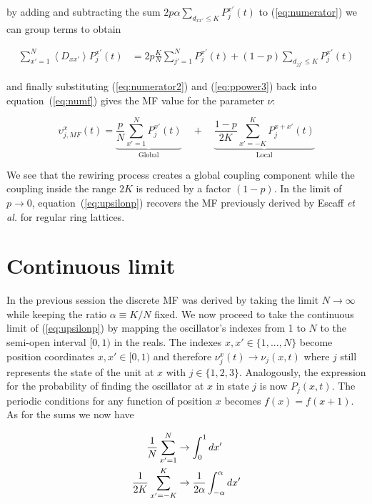 \noindent by adding and subtracting the sum $2p\alpha\sum_{d_{xx'} \leq K}P^{x'}_j(t)$ to (\ref{eq:numerator}) we can group terms to
obtain

\begin{align}
    \sum_{x'=1}^N \left< D_{xx'} \right> P_j^{x'}(t) &= 2p\frac{K}{N}\sum_{j'=1}^N P^{x'}_j(t) + (1-p)\sum_{d_{jj'} \leq K} P^{x'}_j(t)
    \label{eq:numerator2}
\end{align}

\noindent and finally substituting (\ref{eq:numerator2}) and (\ref{eq:ppower3}) back into equation~(\ref{eq:numf}) gives the MF value
for the parameter $\nu$:

\begin{equation}
    \upsilon_{j,MF}^x(t) = \underbrace{\frac{p}{N}\sum_{x'=1}^N P^{x'}_j(t)}_{\text{Global}}
\quad + \quad \underbrace{\frac{1-p}{2K}\sum_{x'=-K}^K P^{x+x'}_j(t)}_{\text{Local}}
    \label{eq:upsilonp}
\end{equation}

We see that the rewiring process creates a global coupling component while the coupling inside the range $2K$ is reduced by a factor
$(1-p)$. In the limit of $p\to 0$, equation~(\ref{eq:upsilonp}) recovers the MF previously derived by Escaff \textit{et al.} for
regular ring lattices\cite{escaff2014arrays}.

\section{Continuous limit}

In the previous session the discrete MF was derived by taking the limit $N\to\infty$ while keeping the ratio $\alpha\equiv K/N$ fixed.
We now proceed to take the continuous limit of (\ref{eq:upsilonp}) by mapping the oscillator's indexes from 1 to $N$ to the semi-open
interval $[0,1)$ in the reals. The indexes $x,x' \in \{1,...,N\}$ become position coordinates $x,x'\in [0,1)$ and therefore $\nu^x_j(t)
\to \nu_j(x,t)$ where $j$ still represents the state of the unit at $x$ with $j\in\{1,2,3\}$. Analogously, the expression for the
probability of finding the oscillator at $x$ in state $j$ is now $P_j(x,t)$. The periodic conditions for any function of position $x$
becomes $f(x)=f(x+1)$. As for the sums we now have

\begin{align}
    \frac{1}{N}\sum_{x'=1}^N &\to \int_{0}^{1} dx' \notag\\
    \frac{1}{2K}\sum_{x'=-K}^K &\to \frac{1}{2\alpha}\int_{-\alpha}^{\alpha} dx'
\end{align}

